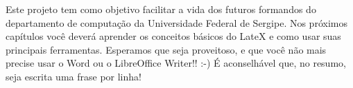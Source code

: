 Este projeto tem como objetivo facilitar a vida dos futuros formandos do departamento de computação da Universidade Federal de Sergipe.
Nos próximos capítulos você deverá aprender os conceitos básicos do LateX e como usar suas principais ferramentas.
Esperamos que seja proveitoso, e que você não mais precise usar o Word ou o LibreOffice Writer!! :-)
É aconselhável que, no resumo, seja escrita uma frase por linha!

